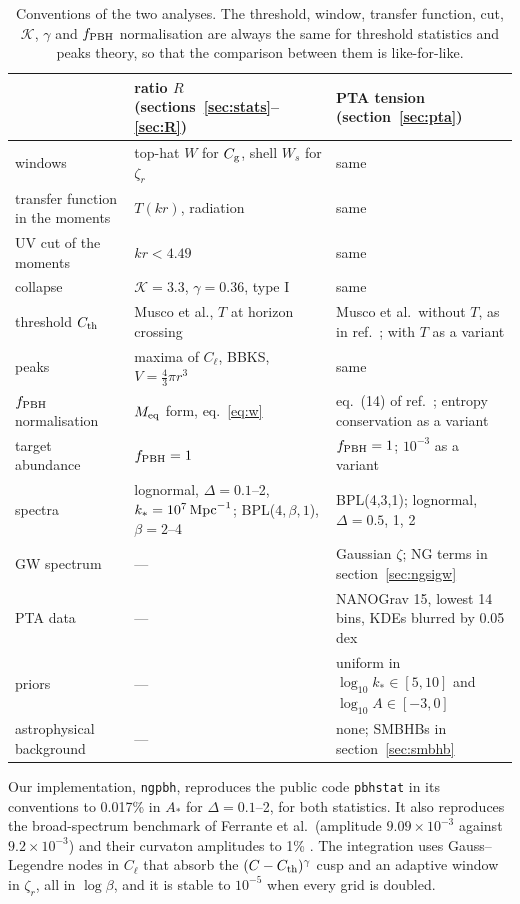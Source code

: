 \documentclass[a4paper,11pt]{article}
\newcommand{\Cg}{C_{\rm g}}
\newcommand{\Cl}{C_{\ell}}
\newcommand{\zr}{\zeta_r}
\newcommand{\fpbh}{f_{\rm PBH}}
\begin{document}
\begin{table}[t]
\centering\small
\begin{tabular}{@{}>{\raggedright\arraybackslash}p{3.2cm}>{\raggedright\arraybackslash}p{5.4cm}>{\raggedright\arraybackslash}p{6.0cm}@{}}
\toprule
 & ratio $R$ (sections~\ref{sec:stats}--\ref{sec:R}) & PTA tension (section~\ref{sec:pta})\\
\midrule
windows & top-hat $W$ for $\Cg$, shell $W_s$ for $\zr$ & same\\
transfer function in the moments & $T(kr)$, radiation & same\\
UV cut of the moments & $kr<4.49$ & same\\
collapse & $\mathcal K=3.3$, $\gamma=0.36$, type I & same\\
threshold $C_{\rm th}$ & Musco et al., $T$ at horizon crossing & Musco et al.\ without $T$, as in
ref.~\cite{FIVT23}; with $T$ as a variant\\
peaks & maxima of $\Cl$, BBKS, $V=\frac43\pi r^3$ & same\\
$\fpbh$ normalisation & $M_{\rm eq}$ form, eq.~\eqref{eq:w} & eq.~(14) of ref.~\cite{FIVT23}; entropy
conservation as a variant\\
target abundance & $\fpbh=1$ & $\fpbh=1$; $10^{-3}$ as a variant\\
spectra & lognormal, $\Delta=0.1$--2, $k_*=10^7\,{\rm Mpc}^{-1}$; BPL($4,\beta,1$), $\beta=2$--4 &
BPL(4,3,1); lognormal, $\Delta=0.5$, 1, 2\\
GW spectrum & --- & Gaussian $\zeta$; NG terms in section~\ref{sec:ngsigw}\\
PTA data & --- & NANOGrav 15, lowest 14 bins, KDEs blurred by 0.05 dex\\
priors & --- & uniform in $\log_{10}k_*\in[5,10]$ and $\log_{10}A\in[-3,0]$\\
astrophysical background & --- & none; SMBHBs in section~\ref{sec:smbhb}\\
\bottomrule
\end{tabular}
\caption{Conventions of the two analyses. The threshold, window, transfer function, cut,
$\mathcal K$, $\gamma$ and $\fpbh$ normalisation are always the same for threshold statistics and
peaks theory, so that the comparison between them is like-for-like.}
\label{tab:conv}
\end{table}

Our implementation, \texttt{ngpbh}, reproduces the public code \texttt{pbhstat}
\cite{ColeFumagalli} in its conventions to 0.017\% in $A_*$ for $\Delta=0.1$--2, for both
statistics. It also reproduces the broad-spectrum benchmark of Ferrante et al.\ (amplitude
$9.09\times10^{-3}$ against $9.2\times10^{-3}$) and their curvaton amplitudes to 1\%
\cite{Ferrante}. The integration uses Gauss--Legendre nodes in $\Cl$ that absorb the
$(C-C_{\rm th})^\gamma$ cusp and an adaptive window in $\zr$, all in $\log\beta$, and it is stable
to $10^{-5}$ when every grid is doubled.
\end{document}
